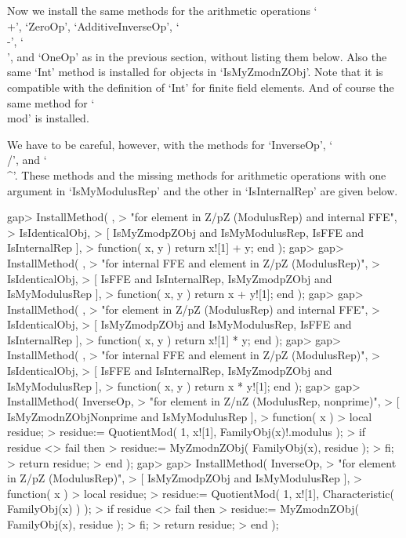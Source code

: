 Now we install the same methods for the arithmetic operations
`\\+', `ZeroOp', `AdditiveInverseOp', `\\-', `\\\*', and `OneOp'
as in the previous section, without listing them below.
Also the same `Int' method is installed for objects in `IsMyZmodnZObj'.
Note that it is compatible with the definition of `Int' for finite
field elements.
And of course the same method for `\\mod' is installed.

We have to be careful, however, with the methods for `InverseOp',
`\\/', and `\\^'.
These methods and the missing methods for arithmetic operations with
one argument in `IsMyModulusRep' and the other in `IsInternalRep'
are given below.

\beginexample
gap> InstallMethod( \+,
>    "for element in Z/pZ (ModulusRep) and internal FFE",
>    IsIdenticalObj,
>    [ IsMyZmodpZObj and IsMyModulusRep, IsFFE and IsInternalRep ],
>    function( x, y ) return x![1] + y; end );
gap> 
gap> InstallMethod( \+,
>    "for internal FFE and element in Z/pZ (ModulusRep)",
>    IsIdenticalObj,
>    [ IsFFE and IsInternalRep, IsMyZmodpZObj and IsMyModulusRep ],
>    function( x, y ) return x + y![1]; end );
gap> 
gap> InstallMethod( \*,
>    "for element in Z/pZ (ModulusRep) and internal FFE",
>    IsIdenticalObj,
>    [ IsMyZmodpZObj and IsMyModulusRep, IsFFE and IsInternalRep ],
>    function( x, y ) return x![1] * y; end );
gap> 
gap> InstallMethod( \*,
>    "for internal FFE and element in Z/pZ (ModulusRep)",
>    IsIdenticalObj,
>    [ IsFFE and IsInternalRep, IsMyZmodpZObj and IsMyModulusRep ],
>    function( x, y ) return x * y![1]; end );
gap> 
gap> InstallMethod( InverseOp,
>    "for element in Z/nZ (ModulusRep, nonprime)",
>    [ IsMyZmodnZObjNonprime and IsMyModulusRep ],
>    function( x )
>    local residue;
>    residue:= QuotientMod( 1, x![1], FamilyObj(x)!.modulus );
>    if residue <> fail then
>      residue:= MyZmodnZObj( FamilyObj(x), residue );
>    fi;
>    return residue;
>    end );
gap> 
gap> InstallMethod( InverseOp,
>    "for element in Z/pZ (ModulusRep)",
>    [ IsMyZmodpZObj and IsMyModulusRep ],
>    function( x )
>    local residue;
>    residue:= QuotientMod( 1, x![1], Characteristic( FamilyObj(x) ) );
>    if residue <> fail then
>      residue:= MyZmodnZObj( FamilyObj(x), residue );
>    fi;
>    return residue;
>    end );
\endexample


